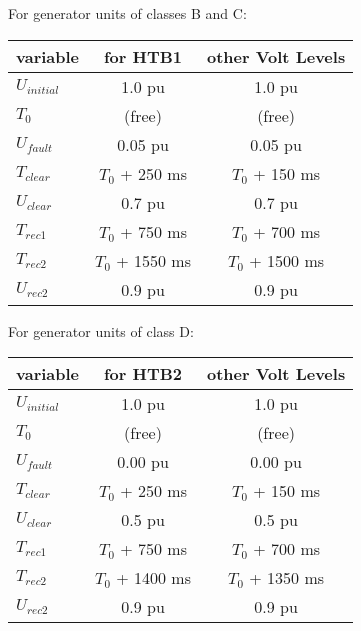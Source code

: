     For generator units of classes B and C:
    \begin{center}
        \begin{tabular}{lcc}
            \toprule
            \textbf{variable} & \textbf{for HTB1} & \textbf{other Volt Levels} \\
            \midrule
            $U_{initial}$     & 1.0 pu            & 1.0 pu                     \\
            $T_{0}$           & (free)            & (free)                     \\
            $U_{fault}$       & 0.05 pu           & 0.05 pu                    \\
            $T_{clear}$       & $T_{0}$ + 250 ms  & $T_{0}$ + 150 ms           \\
            $U_{clear}$       & 0.7 pu            & 0.7 pu                     \\
            $T_{rec1 }$       & $T_{0}$ + 750 ms  & $T_{0}$ + 700 ms           \\
            $T_{rec2 }$       & $T_{0}$ + 1550 ms & $T_{0}$ + 1500 ms          \\
            $U_{rec2}$        & 0.9 pu            & 0.9 pu                     \\
            \bottomrule
        \end{tabular}
    \end{center}

    For generator units of class D:
    \begin{center}
        \begin{tabular}{lcc}
            \toprule
            \textbf{variable} & \textbf{for HTB2} & \textbf{other Volt Levels} \\
            \midrule
            $U_{initial}$     & 1.0 pu            & 1.0 pu                     \\
            $T_{0}$           & (free)            & (free)                     \\
            $U_{fault}$       & 0.00 pu           & 0.00 pu                    \\
            $T_{clear}$       & $T_{0}$ + 250 ms  & $T_{0}$ + 150 ms           \\
            $U_{clear}$       & 0.5 pu            & 0.5 pu                     \\
            $T_{rec1 }$       & $T_{0}$ + 750 ms  & $T_{0}$ + 700 ms           \\
            $T_{rec2 }$       & $T_{0}$ + 1400 ms & $T_{0}$ + 1350 ms          \\
            $U_{rec2}$        & 0.9 pu            & 0.9 pu                     \\
            \bottomrule
        \end{tabular}
    \end{center}


